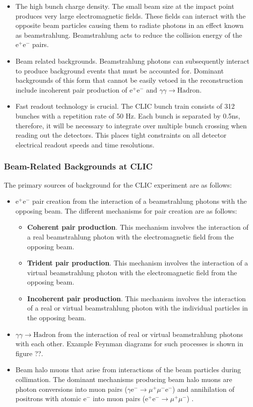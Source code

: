 \begin{itemize}
\item The high bunch charge density.  The small beam size at the impact point produces very large electromagnetic fields.  These fields can interact with the opposite beam particles causing them to radiate photons in an effect known as beamstrahlung.  Beamstrahlung acts to reduce the collision energy of the $\text{e}^{+}\text{e}^{-}$ pairs.   
\item Beam related backgrounds.  Beamstrahlung photons can subsequently interact to produce background events that must be accounted for.  Dominant backgrounds of this form that cannot be easily vetoed in the reconstruction include incoherent pair production of $\text{e}^{+}\text{e}^{-}$ and $\gamma\gamma \rightarrow \text{Hadron}$.  
\item Fast readout technology is crucial.  The CLIC bunch train consists of 312 bunches with a repetition rate of 50 Hz.  Each bunch is separated by 0.5ns, therefore, it will be necessary to integrate over multiple bunch crossing when reading out the detectors.  This places tight constraints on all detector electrical readout speeds and time resolutions.   
\end{itemize}

\subsubsection{Beam-Related Backgrounds at CLIC}
The primary sources of background for the CLIC experiment are as follows:
\begin{itemize}
\item $\text{e}^{+}\text{e}^{-}$ pair creation from the interaction of a beamstrahlung photons with the opposing beam.  The different mechanisms for pair creation are as follows:
\begin{itemize}
\item \textbf{Coherent pair production}.  This mechanism involves the interaction of a real beamstrahlung photon with the electromagnetic field from the opposing beam.
\item \textbf{Trident pair production}.  This mechanism involves the interaction of a virtual beamstrahlung photon with the electromagnetic field from the opposing beam.
\item \textbf{Incoherent pair production}.  This mechanism involves the interaction of a real or virtual beamstrahlung photon with the individual particles in the opposing beam.
\end{itemize}
\item $\gamma\gamma \rightarrow \text{Hadron}$ from the interaction of real or virtual beamstrahlung photons with each other.  Example Feynman diagrams for such processes is shown in figure ??. 
\item Beam halo muons that arise from interactions of the beam particles during collimation.  The dominant mechanisms producing beam halo muons are photon conversions into muon pairs ($\gamma \text{e}^{-} \rightarrow \mu^{+}\mu^{-}\text{e}^{-}$) and annihilation of positrons with atomic $\text{e}^{-}$ into muon pairs ($\text{e}^{+}\text{e}^{-} \rightarrow \mu^{+}\mu^{-}$) \cite{Pilicer:2015ijy}.
\end{itemize}

